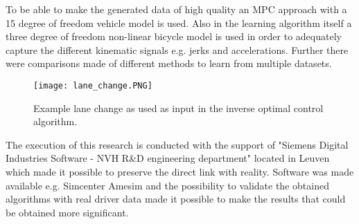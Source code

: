 To be able to make the generated data of high quality an MPC approach with a 15 degree of freedom vehicle model is used. Also in the learning algorithm itself a three degree of freedom non-linear bicycle model is used in order to adequately capture the different kinematic signals e.g. jerks and accelerations. Further there were comparisons made of different methods to learn from multiple datasets. \\

\begin{figure}[htp]
	\centering
	\texttt{[image: lane\_change.PNG]}
	\caption{Example lane change as used as input in the inverse optimal control algorithm.}
	\label{fig:lane_change}
\end{figure}

The execution of this research is conducted with the support of "Siemens Digital Industries Software - NVH R\&D engineering department" located in Leuven which made it possible to preserve the direct link with reality. Software was made available e.g. Simcenter Amesim and the possibility to validate the obtained algorithms with real driver data made it possible to make the results that could be obtained more significant.\\


%
%


